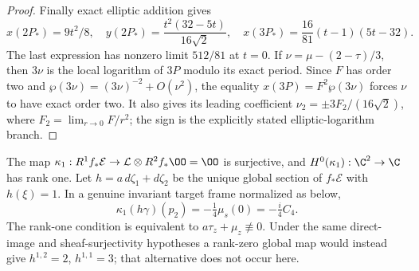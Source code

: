 \begin{proof}
Finally exact elliptic addition gives
\[
x(2P_*)=9t^2/8,\quad
y(2P_*)=\frac{t^2(32-5t)}{16\sqrt2},\quad
x(3P_*)=\frac{16}{81}(t-1)(5t-32).
\]
The last expression has nonzero limit $512/81$ at $t=0$.
If $\nu=\mu-(2-\tau)/3$, then $3\nu$ is the local logarithm of
$3P$ modulo its exact period.  Since $F$ has order two and
$\wp(3\nu)=(3\nu)^{-2}+O(\nu^2)$, the equality
$x(3P)=F^2\wp(3\nu)$ forces $\nu$ to have exact order two.
It also gives its leading coefficient
$\nu_2=\pm3F_2/(16\sqrt2)$, where $F_2=\lim_{r\to0}F/r^2$;
the sign is the explicitly stated elliptic-logarithm branch.
\end{proof}

\begin{proposition}\label{inv:A2.4}
The map
$\kappa_1:R^1f_*\mathcal E\to\mathcal L\otimes R^2f_*\OO=\OO$
is surjective, and $H^0(\kappa_1):\C^2\to\C$ has rank one.
Let $h=a\,d\zeta_1+d\zeta_2$ be the unique global section of
$f_*\mathcal E$ with $h(\xi)=1$.  In a genuine invariant target
frame normalized as below,
\[
\kappa_1(h\gamma)(p_2)=-\tfrac14\mu_s(0)=-\tfrac i4 C_4.
\]
The rank-one condition is equivalent to
$a\tau_z+\mu_z\not\equiv0$.  Under the same direct-image and
sheaf-surjectivity hypotheses a rank-zero global map would instead
give $h^{1,2}=2$, $h^{1,1}=3$; that alternative does not occur here.
\end{proposition}
